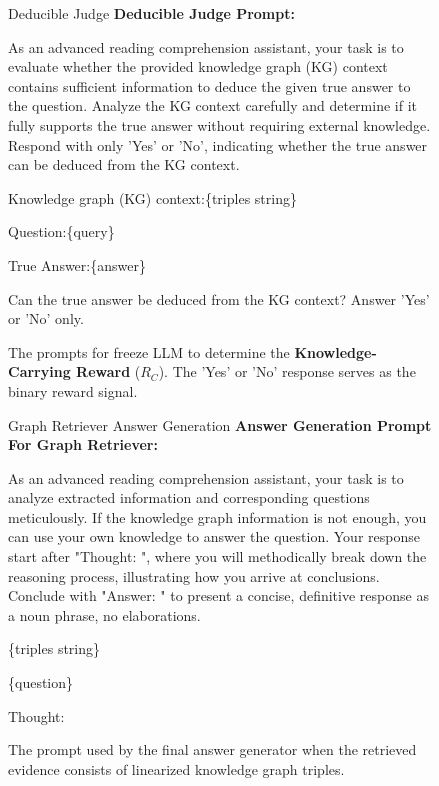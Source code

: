 \documentclass[11pt]{article}
\begin{document}
\begin{figure}[!ht]
    \small
    \begin{AIbox}{{Deducible Judge}}
\textbf{Deducible Judge Prompt:}

As an advanced reading comprehension assistant, your task is to evaluate whether the provided knowledge graph (KG) context contains sufficient information to deduce the given true answer to the question. 
Analyze the KG context carefully and determine if it fully supports the true answer without requiring external knowledge. Respond with only 'Yes' or 'No', indicating whether the true answer can be deduced from the KG context.


Knowledge graph (KG) context:\{triples string\} 

Question:\{query\}

True Answer:\{answer\}

Can the true answer be deduced from the KG context? Answer 'Yes' or 'No' only.

\end{AIbox}
\caption{The prompts for freeze LLM to determine the \textbf{Knowledge-Carrying Reward} ($R_C$). The 'Yes' or 'No' response serves as the binary reward signal.}
\label{fig:prompt_deducibility_judge}
\end{figure}

\begin{figure}[t!]
    \small
    \begin{AIbox}{{Graph Retriever Answer Generation}}
\textbf{Answer Generation Prompt For Graph Retriever:}

As an advanced reading comprehension assistant, your task is to analyze extracted information and corresponding questions meticulously. If the knowledge graph information is not enough, you can use your own knowledge to answer the question. 
Your response start after "Thought: ", where you will methodically break down the reasoning process, illustrating how you arrive at conclusions. 
Conclude with "Answer: " to present a concise, definitive response as a noun phrase, no elaborations.

\{triples string\}

\{question\}

Thought:
\end{AIbox}
\caption{The prompt used by the final answer generator when the retrieved evidence consists of linearized knowledge graph triples.}
\label{fig:prompt_ans_gen_graph}
\end{figure}
\end{document}
